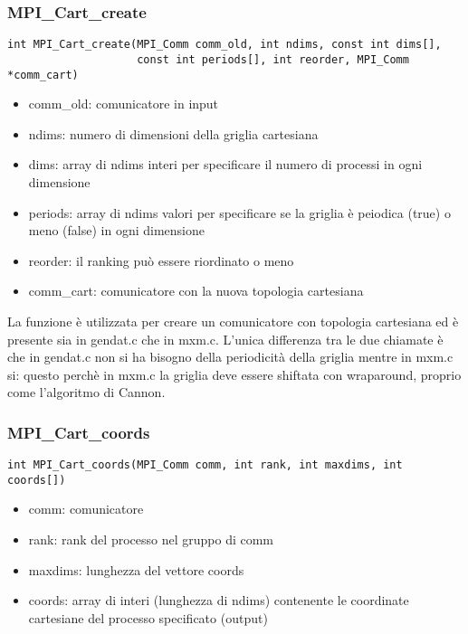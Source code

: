 \subsubsection{MPI\_Cart\_create}
\begin{lstlisting}
int MPI_Cart_create(MPI_Comm comm_old, int ndims, const int dims[],
                    const int periods[], int reorder, MPI_Comm *comm_cart)
\end{lstlisting}
\begin{itemize}
  \item comm\_old: comunicatore in input
  \item ndims: numero di dimensioni della griglia cartesiana
  \item dims: array di ndims interi per specificare il numero di processi in ogni dimensione
  \item periods: array di ndims valori per specificare se la griglia \`{e} peiodica (true) o meno (false) in ogni dimensione
  \item reorder: il ranking pu\`{o} essere riordinato o meno
  \item comm\_cart: comunicatore con la nuova topologia cartesiana
\end{itemize}

La funzione \`{e} utilizzata per creare un comunicatore con topologia cartesiana ed \`{e} presente sia in gendat.c che in mxm.c. L'unica differenza tra le due chiamate \`{e} che in gendat.c non si ha bisogno della periodicit\`{a} della griglia mentre in mxm.c si: questo perch\`{e} in mxm.c la griglia deve essere shiftata con wraparound, proprio come l'algoritmo di Cannon.

\subsubsection{MPI\_Cart\_coords}
\begin{lstlisting}
int MPI_Cart_coords(MPI_Comm comm, int rank, int maxdims, int coords[])
\end{lstlisting}
\begin{itemize}
  \item comm: comunicatore
  \item rank: rank del processo nel gruppo di comm
  \item maxdims: lunghezza del vettore coords
  \item coords: array di interi (lunghezza di ndims) contenente le coordinate cartesiane del processo specificato (output)
\end{itemize}

